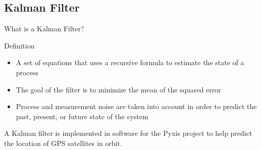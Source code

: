 \documentclass[10pt, handout, aspectratio=169]{beamer}
\begin{document}
\subsection{Kalman Filter}
	\begin{frame}{What is a Kalman Filter?}
		\begin{block}{Definition}
			\begin{itemize}
				\item A set of equations that uses a recursive formula to estimate the state of a process
				\item The goal of the filter is to minimize the mean of the squared error
				\item Process and measurement noise are taken into account in order to predict the past, present, or future state of the system \cite{welch:1995}
			\end{itemize}
		\end{block}
		\vspace{.5em}
		A Kalman filter is implemented in software for the Pyxis project to help predict the location of GPS satellites in orbit.
	\end{frame}
\end{document}

